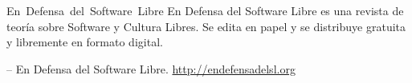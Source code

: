     \newpage
    \thispagestyle{empty}

    \begin{flushleft}\hbox{\Large{En Defensa del Software Libre}}
    En Defensa del Software Libre es una revista de teoría sobre Software y Cultura
    Libres. Se edita en papel y se distribuye gratuita y libremente en formato
    digital.

    \vfill
    \copyleft  \the\year -- En Defensa del Software Libre.
    \url{http://endefensadelsl.org}

    \end{flushleft}
   \newpage

